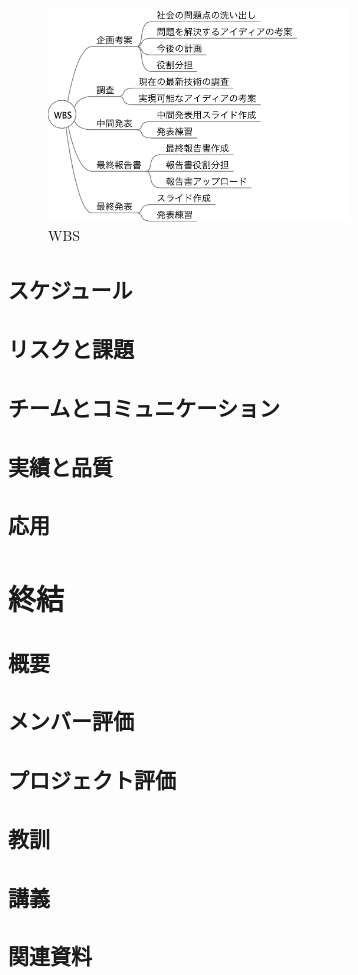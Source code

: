 \documentclass[11pt,a4paper]{jsarticle}
\begin{document}
\begin{figure}[htbp]
\begin{center}
\includegraphics[width=8cm]{WBS.pdf}
\end{center}
\caption{WBS}
\end{figure}

\subsection{スケジュール}
\subsection{リスクと課題}
\subsection{チームとコミュニケーション}
\subsection{実績と品質}
\subsection{応用}
\section{終結}
\subsection{概要}
\subsection{メンバー評価}
\subsection{プロジェクト評価}
\subsection{教訓}
\subsection{講義}
\subsection{関連資料}
\end{document}
